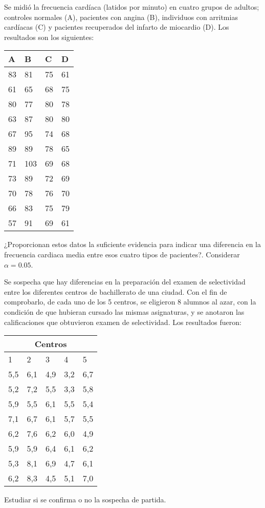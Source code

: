 {Se midió la frecuencia cardíaca (latidos por minuto) en cuatro grupos de adultos; controles normales (A), pacientes con angina (B), individuos con arritmias cardíacas (C) y pacientes recuperados del infarto de miocardio (D).
Los resultados son los siguientes:
\begin{center}
\begin{tabular}{llll}
A & B & C & D \\
\hline
83 & 81 & 75 & 61 \\
61 & 65 & 68 & 75 \\
80 & 77 & 80 & 78 \\
63 & 87 & 80 & 80 \\
67 & 95 & 74 & 68 \\
89 & 89 & 78 & 65 \\
71 & 103 & 69 & 68 \\
73 & 89 & 72 & 69 \\
70 & 78 & 76 & 70 \\
66 & 83 & 75 & 79 \\
57 & 91 & 69 & 61 \\
\hline
\end{tabular}
\end{center}
¿Proporcionan estos datos la suficiente evidencia para indicar una diferencia en la frecuencia cardiaca media entre esos cuatro tipos de pacientes?.
Considerar $\alpha=0.05$.
}


{Se sospecha que hay diferencias en la preparación del examen de selectividad entre los diferentes centros de bachillerato de una ciudad.
Con el fin de comprobarlo, de cada uno de los 5 centros, se eligieron 8 alumnos al azar, con la condición de que hubieran cursado las mismas asignaturas, y se anotaron las calificaciones que obtuvieron examen de selectividad.
Los resultados fueron:
\begin{center}
\begin{tabular}{lllll}
\multicolumn{5}{c}{Centros} \\
\hline
1 & 2 & 3 & 4 & 5 \\
\hline
5,5 & 6,1 & 4,9 & 3,2 & 6,7 \\
5,2 & 7,2 & 5,5 & 3,3 & 5,8 \\
5,9 & 5,5 & 6,1 & 5,5 & 5,4 \\
7,1 & 6,7 & 6,1 & 5,7 & 5,5 \\
6,2 & 7,6 & 6,2 & 6,0 & 4,9 \\
5,9 & 5,9 & 6,4 & 6,1 & 6,2 \\
5,3 & 8,1 & 6,9 & 4,7 & 6,1 \\
6,2 & 8,3 & 4,5 & 5,1 & 7,0 \\
\hline
\end{tabular}
\end{center}
Estudiar si se confirma o no la sospecha de partida.
}


